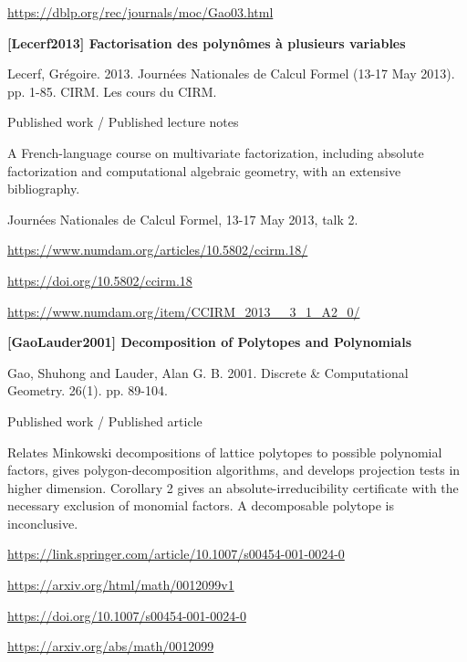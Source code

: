 \documentclass[11pt,a4paper,oneside,openany]{book}
\begin{document}
{\footnotesize\url{https://dblp.org/rec/journals/moc/Gao03.html}}\par
\vspace{9pt}
\hypertarget{ref:Lecerf2013}{}
{\sffamily\bfseries\color{atlasgreen}[Lecerf2013] Factorisation des polynômes à plusieurs variables}\par
\color{black} Lecerf, Grégoire. 2013. Journées Nationales de Calcul Formel (13-17 May 2013). pp. 1-85. CIRM. Les cours du CIRM.\par
{\small\sffamily\color{atlasgold}Published work / Published lecture notes}\par
\color{black} A French-language course on multivariate factorization, including absolute factorization and computational algebraic geometry, with an extensive bibliography.\par
{\small Journées Nationales de Calcul Formel, 13-17 May 2013, talk 2.}\par
{\footnotesize\url{https://www.numdam.org/articles/10.5802/ccirm.18/}}\par
{\footnotesize\url{https://doi.org/10.5802/ccirm.18}}\par
{\footnotesize\url{https://www.numdam.org/item/CCIRM_2013__3_1_A2_0/}}\par
\vspace{9pt}
\hypertarget{ref:GaoLauder2001}{}
{\sffamily\bfseries\color{atlasgreen}[GaoLauder2001] Decomposition of Polytopes and Polynomials}\par
\color{black} Gao, Shuhong and Lauder, Alan G. B. 2001. Discrete \& Computational Geometry. 26(1). pp. 89-104.\par
{\small\sffamily\color{atlasgold}Published work / Published article}\par
\color{black} Relates Minkowski decompositions of lattice polytopes to possible polynomial factors, gives polygon-decomposition algorithms, and develops projection tests in higher dimension. Corollary 2 gives an absolute-irreducibility certificate with the necessary exclusion of monomial factors. A decomposable polytope is inconclusive.\par
{\footnotesize\url{https://link.springer.com/article/10.1007/s00454-001-0024-0}}\par
{\footnotesize\url{https://arxiv.org/html/math/0012099v1}}\par
{\footnotesize\url{https://doi.org/10.1007/s00454-001-0024-0}}\par
{\footnotesize\url{https://arxiv.org/abs/math/0012099}}\par
\end{document}
